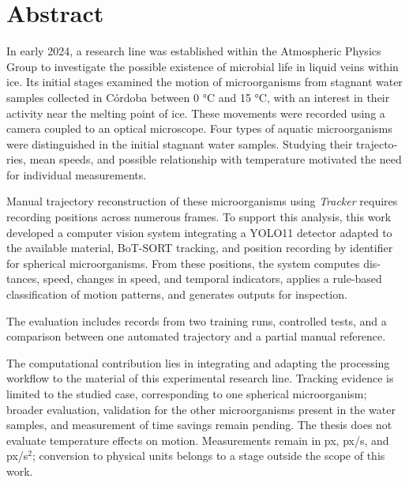 \chapter*{Abstract}

\begin{otherlanguage}{english}
In early 2024, a research line was established within the Atmospheric Physics Group to investigate the possible existence of microbial life in liquid veins within ice. Its initial stages examined the motion of microorganisms from stagnant water samples collected in Córdoba between 0 °C and 15 °C, with an interest in their activity near the melting point of ice. These movements were recorded using a camera coupled to an optical microscope. Four types of aquatic microorganisms were distinguished in the initial stagnant water samples. Studying their trajectories, mean speeds, and possible relationship with temperature motivated the need for individual measurements.

Manual trajectory reconstruction of these microorganisms using \textit{Tracker} requires recording positions across numerous frames. To support this analysis, this work developed a computer vision system integrating a YOLO11 detector adapted to the available material, BoT-SORT tracking, and position recording by identifier for spherical microorganisms. From these positions, the system computes distances, speed, changes in speed, and temporal indicators, applies a rule-based classification of motion patterns, and generates outputs for inspection.

The evaluation includes records from two training runs, controlled tests, and a comparison between one automated trajectory and a partial manual reference.

The computational contribution lies in integrating and adapting the processing workflow to the material of this experimental research line. Tracking evidence is limited to the studied case, corresponding to one spherical microorganism; broader evaluation, validation for the other microorganisms present in the water samples, and measurement of time savings remain pending. The thesis does not evaluate temperature effects on motion. Measurements remain in px, px/s, and px/s$^2$; conversion to physical units belongs to a stage outside the scope of this work.
\end{otherlanguage}
